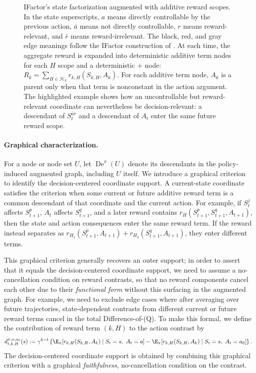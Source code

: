 \documentclass[opre,nonblindrev]{informs4}
\newenvironment{revision}{\begingroup\color{revisionblue}\ignorespaces}{\endgroup}
\begin{document}
\begin{revision}
\begin{figure}[ht!]
{\begin{tikzpicture}
\end{tikzpicture}

}
\caption{IFactor's state factorization augmented with additive reward
scopes. In the state superscripts, \(a\) means directly controllable by the
previous action, \(\bar a\) means not directly controllable, \(r\) means
reward-relevant, and \(\bar r\) means reward-irrelevant. The black, red, and gray edge meanings
follow the IFactor construction of \citet{liu2023}. At each time, the aggregate reward is expanded into deterministic additive term
nodes for each $H$ scope and a deterministic \(+\) node:
\(R_k=\sum_{H\in\mathcal H_k}r_{k,H}(S_{k,H},A_k)\).
For each additive term node, \(A_k\) is a parent only when that term is nonconstant in
the action argument. 
The highlighted example shows how an uncontrollable but reward-relevant
coordinate can nevertheless be decision-relevant: a descendant of
\(S_t^{\bar a r}\) and a descendant of \(A_t\) enter the same future reward
scope.}
\label{fig:ifactor-reward-scopes}
\end{figure}
\FloatBarrier

\paragraph{Graphical characterization.}
For a node or node set \(U\), let \(\operatorname{De}^{\pi}(U)\) denote its
descendants in the policy-induced augmented graph, including \(U\) itself.
We introduce a graphical criterion to identify the decision-centered coordinate support. A current-state coordinate satisfies the criterion when some current or future additive reward term is a common descendant of that coordinate and the current action. For example, if
\(S_t^j\) affects \(S_{t+1}^p\), \(A_t\) affects \(S_{t+1}^q\), and a later
reward contains \(r_H(S_{t+1}^p,S_{t+1}^q, A_{t+1})\), then the state and action
consequences enter the same reward term. If the reward instead separates as
\(r_{H_1}(S_{t+1}^p,A_{t+1})+r_{H_2}(S_{t+1}^q,A_{t+1})\), they enter different terms.

This graphical criterion generally recovers an outer support; in order to assert that it equals the decision-centered coordinate support, we need to assume a no-cancellation condition on reward contrasts, so that no reward components cancel each other due to their \textit{functional form} without this surfacing in the augmented graph. For example, we need to exclude edge cases where after averaging over future trajectories, state-dependent contrasts from different current or future reward terms cancel in the total Difference-of-(Q). To make this formal, we define the contribution of reward
term \((k,H)\) to the action contrast by
\begin{equation}
 d_{t,k,H}^{\pi,a,a_0}(s)
 :=
 \gamma^{k-t}
 \left\{
\E_{\pi}[r_{k,H}(S_{k,H},A_k)\mid S_t=s,\ A_t=a]
-
 \E_{\pi}[r_{k,H}(S_{k,H},A_k)\mid S_t=s,\ A_t=a_0]
 \right\}.
\label{eq:termwise-contrast}
\end{equation}
The decision-centered coordinate support is obtained by combining this graphical criterion with a graphical \textit{faithfulness}, no-cancellation condition on the contrast. 


\end{revision}
\end{document}
